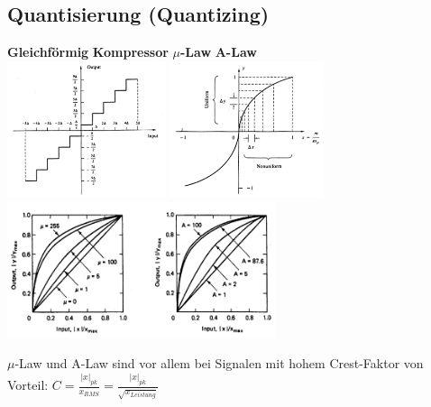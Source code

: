 \subsection{Quantisierung (Quantizing)}
	\begin{center}	
		\textbf{Gleichförmig} \hspace{3cm}
		\textbf{Kompressor} \hspace{2.9cm}
		\textbf{$\mu$-Law} \hspace{3cm}
		\textbf{A-Law}  \\
		\includegraphics[height=4cm]{bilder/dig_quant_gleichfoermig.png} \hspace{0.5cm}
		\includegraphics[height=4cm]{bilder/dig_quant_ungleichfoermig.png} \hspace{0.5cm}
		\includegraphics[height=4cm]{bilder/dig_quant_lulaw_ralaw.png}	
	\end{center}
	$\mu$-Law und A-Law sind vor allem bei Signalen mit hohem Crest-Faktor von
	Vorteil: $C = \frac{\left|x\right|_{pk}}{x_{RMS}} =
	\frac{\left|x\right|_{pk}}{\sqrt{x_{Leistung}}}$
\renewcommand{\arraystretch}{1}

